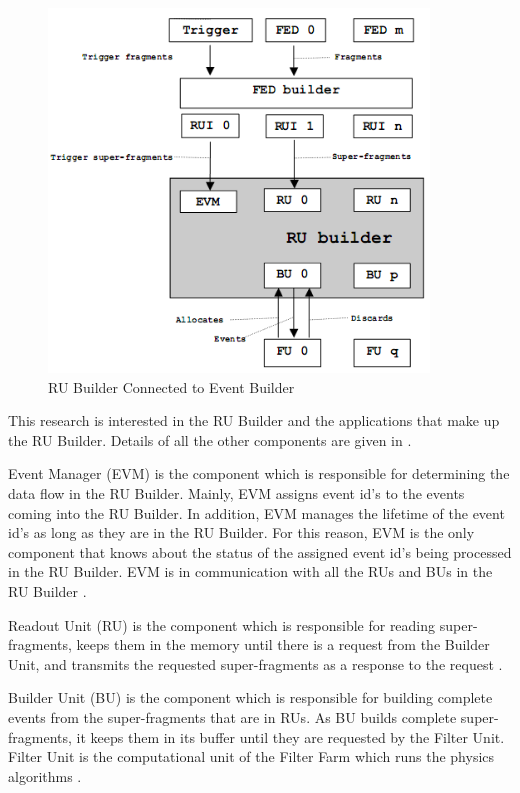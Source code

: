 \begin{figure}
	\centering
		\includegraphics[width=0.90\textwidth]{figures/evbsystem.png}
	\caption{RU Builder Connected to Event Builder}
	\label{fig:evbsystem}
\end{figure}

This research is interested in the RU Builder and the applications that make up the RU Builder. Details of all the other components are given in \cite{CMSTDR}.

Event Manager (EVM) is the component which is responsible for determining the data flow in the RU Builder. Mainly, EVM assigns event id's to the events coming into the RU Builder. In addition, EVM manages the lifetime of the event id's as long as they are in the RU Builder. For this reason, EVM is the only component that knows about the status of the assigned event id's being processed in the RU Builder. EVM is in communication with all the RUs and BUs in the RU Builder \cite{CMSTDR}.

Readout Unit (RU) is the component which is responsible for reading super-fragments, keeps them in the memory until there is a request from the Builder Unit, and transmits the requested super-fragments as a response to the request \cite{CMSTDR}. 

Builder Unit (BU) is the component which is responsible for building complete events from the super-fragments that are in RUs. As BU builds complete super-fragments, it keeps them in its buffer until they are requested by the Filter Unit. Filter Unit is the computational unit of the Filter Farm which runs the physics algorithms \cite{CMSTDR}.

